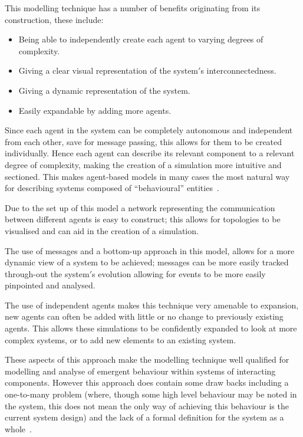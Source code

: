 \documentclass{article}
\begin{document}
This modelling technique has a number of benefits originating from its construction, these include:
\begin{itemize}
   \item Being able to independently create each agent to varying degrees of complexity. 
   \item Giving a clear visual representation of the system$'$s interconnectedness.
   \item Giving a dynamic representation of the system.
   \item Easily expandable by adding more agents.  
\end{itemize} 

Since each agent in the system can be completely autonomous and independent from each other, save for message passing, this allows for them to be created individually. Hence each agent can describe its relevant component to a relevant degree of complexity, making the creation of a simulation more intuitive and sectioned. This makes agent-based models in many cases the most natural way for describing systems composed of ``behavioural'' entities~\cite{techsadsProbsabm}.

Due to the set up of this model a network representing the communication between different agents is easy to construct; this allows for topologies to be visualised and can aid in the creation of a simulation.    

The use of messages and a bottom-up approach in this model, allows for a more dynamic view of a system to be achieved; messages can be more easily tracked through-out the system$'$s evolution allowing for events to be more easily pinpointed and analysed.  

The use of independent agents makes this technique very amenable to expansion, new agents can often be added with little or no change to previously existing agents. This allows these simulations to be confidently expanded to look at more complex systems, or to add new elements to an existing system.  

These aspects of this approach make the modelling technique well qualified for modelling and analyse of emergent behaviour within systems of interacting components. However this approach does contain some draw backs including a one-to-many problem (where, though some high level behaviour may be noted in the system, this does not mean the only way of achieving this behaviour is the current system design) and the lack of a formal definition for the system as a whole~\cite{agbntj}.  
\end{document}
